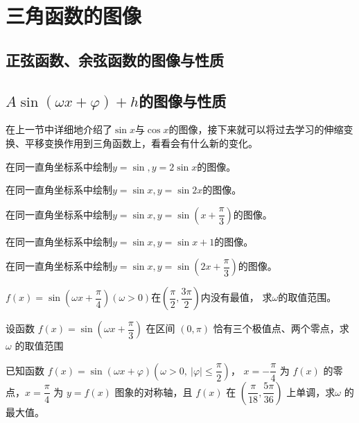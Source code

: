 \section{三角函数的图像}
\subsection{正弦函数、余弦函数的图像与性质}
\clearpage
\subsection{\texorpdfstring{$A\sin(\omega x+\varphi)+h$}s的图像与性质}%
在上一节中详细地介绍了\(\sin x \)与\(\cos x\)的图像，接下来就可以将过去学习的伸缩变换、平移变换作用到三角函数上，看看会有什么新的变化。
\begin{example}
    在同一直角坐标系中绘制\(y=\sin ,y=2\sin x\)的图像。
\end{example}
\begin{example}
    在同一直角坐标系中绘制\(y=\sin x,y=\sin 2x\)的图像。
\end{example}
\begin{example}
    在同一直角坐标系中绘制\(y=\sin x,y=\sin (x+\dfrac{\pi}{3})\)的图像。
\end{example}
\begin{example}
    在同一直角坐标系中绘制\(y=\sin x,y=\sin x+1\)的图像。
\end{example}
\begin{example}
    在同一直角坐标系中绘制\(y=\sin x,y=\sin(2x+\dfrac{\pi}{3})\)的图像。
\end{example}

\begin{example}
    \(f(x)=\sin(\omega x +\dfrac{\pi}{4})\)\((\omega>0)\)在\((\dfrac{\pi}{2},\dfrac{3\pi}{2})\)内没有最值，
    求\(\omega\)的取值范围。
\end{example}


\begin{example}[2022年全国甲卷]
    设函数 \( f(x) = \sin(\omega x + \dfrac{\pi}{3}) \) 在区间 \( (0, \pi) \) 恰有三个极值点、两个零点，求 \(\omega\) 的取值范围
\end{example}

\begin{example}[2016年新课标I卷]
    已知函数 \( f(x) = \sin(\omega x + \varphi) \left(\omega > 0, \ |\varphi| \leq \dfrac{\pi}{2}\right) \)，
    \( x = -\dfrac{\pi}{4} \) 为 \( f(x) \) 的零点，\( x = \dfrac{\pi}{4} \) 为 
    \( y = f(x) \) 图象的对称轴，且 \( f(x) \) 在 \( (\dfrac{\pi}{18}, \dfrac{5\pi}{36}) \) 上单调，求\(\omega\) 的最大值。
\end{example}


